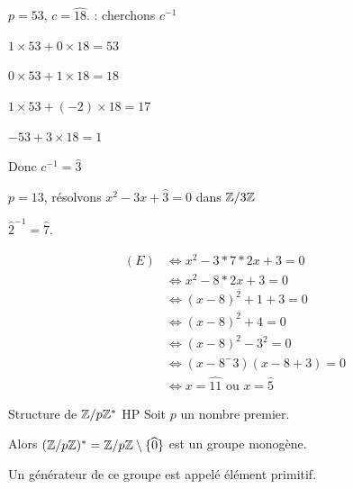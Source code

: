 \begin{exemple}
    $p = 53$, $c = \widehat{18}$. : cherchons $c^{-1}$

    $1\times 53 + 0 \times 18 = 53$
    
    $0 \times 53 + 1 \times 18 = 18$

    $1 \times 53 + (-2) \times 18 = 17$

    $- 53 + 3 \times 18 = 1$ 

    Donc $c^{-1} = \widehat{3} $

    \lvspace $p = 13$, résolvons $x^2 - 3x + \widehat 3 = 0$ dans $\mathbb{Z}/3\mathbb{Z}$

    $\widehat 2^{-1} = \widehat 7$. 

    \begin{align*}
        (E) & \Leftrightarrow x^2 - 3 *7*2x + 3 = 0 \\
        & \Leftrightarrow x^2 - 8 * 2x + 3 = 0 \\
        & \Leftrightarrow (x - 8)^2 + 1 + 3 = 0 \\
        & \Leftrightarrow (x - 8)^2 + 4 = 0 \\
        & \Leftrightarrow (x - 8)^2 - 3^2 = 0 \\
        & \Leftrightarrow (x - 8^- 3)(x - 8 + 3) = 0 \\
        & \Leftrightarrow x = \widehat {11} \text{ ou } x = \widehat {5}
    \end{align*}

\end{exemple}


\begin{theoreme}{Structure de $\mathbb{Z}/p\mathbb{Z} ^*$ HP}{}
    Soit $p$ un nombre premier. 

    Alors $(\mathbb{Z}/p\mathbb{Z})^* = \mathbb{Z}/p\mathbb{Z} \setminus \{\widehat 0\}$ est un groupe monogène. 

    Un générateur de ce groupe est appelé élément primitif. 
\end{theoreme}

